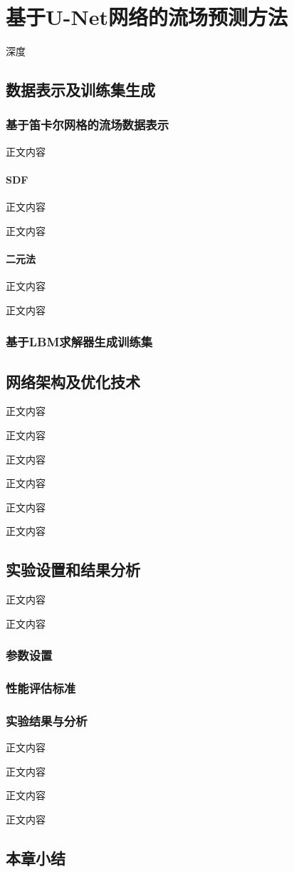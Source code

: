 \chapter{基于U-Net网络的流场预测方法}
深度

\section{数据表示及训练集生成}

\subsection{基于笛卡尔网格的流场数据表示}
正文内容

\subsubsection{SDF}
正文内容

正文内容



\subsubsection{二元法}
正文内容

正文内容

\subsection{基于LBM求解器生成训练集}


\section{网络架构及优化技术}
正文内容

正文内容



正文内容

正文内容

正文内容

正文内容

\section{实验设置和结果分析}
正文内容

正文内容

\subsection{参数设置}



\subsection{性能评估标准}

\subsection{实验结果与分析}
正文内容

正文内容

正文内容

正文内容

\section{本章小结}

